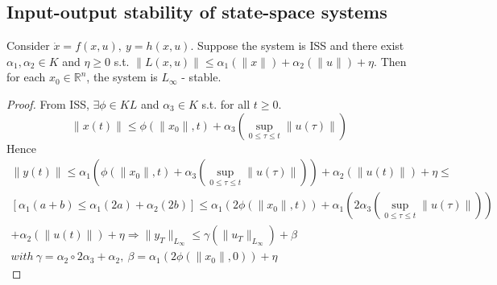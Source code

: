\subsection{Input-output stability of state-space systems}

\begin{Theorem}
Consider $\dot{x} = f(x,u), \ y = h(x,u)$. Suppose the system is ISS and there exist $\alpha_1, \alpha_2 \in K$ and $\eta \geq 0$ s.t. $\|L(x,u)\| \leq \alpha_1(\|x\|) + \alpha_2(\|u\|) + \eta$. Then for each $x_0 \in \mathbb{R}^n$, the system is $L_{\infty}$ - stable.
\begin{proof}
From ISS, $\exists \phi \in KL$ and $\alpha_3 \in K$ s.t. for all $t \geq 0$.
\begin{equation*}
\|x(t)\| \leq \phi(\|x_0\|, t) + \alpha_3(\sup_{0\leq \tau \leq t}\|u(\tau)\|)
\end{equation*}
Hence 
\begin{equation*}
\begin{split}
\|y(t)\| \leq \alpha_1(\phi (\|x_0\|, t) + \alpha_3(\sup_{ 0 \leq \tau 
\leq t}\|u(\tau)\|)) + \alpha_2(\|u(t)\|) + \eta \leq \\ 
[\alpha_1(a+b) \leq \alpha_1(2a)+\alpha_2(2b)] \leq \alpha_1(2\phi(\|x_0\|,t)) + \alpha_1(2 \alpha_3(\sup_{0 \leq \tau \leq t}\|u(\tau)\|))\\
+ \alpha_2(\|u(t)\|)+\eta \Rightarrow \|y_T\|_{L_{\infty}} \leq \gamma(\|u_T\|_{L_{\infty}}) + \beta \\
with\ \gamma = \alpha_2 \circ 2\alpha_3 + \alpha_2, \ \beta = \alpha_1(2\phi(\|x_0\|,0)) + \eta
\end{split}
\end{equation*}
\end{proof}
\end{Theorem}